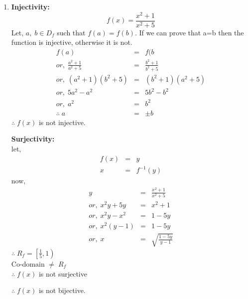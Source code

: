 \documentclass{article}
\begin{document}
\begin{enumerate}
\item{
\begin{minipage}[t]{0.4\linewidth}
\textbf{Injectivity:}
    $$f(x) = \frac{x^2 +1}{x^2+5}$$
Let, $a,\;b\in D_f$ such that $f(a) = f(b)$. If we can prove that a=b then the function is injective, otherwise it is not.
\begin{eqnarray*}
    f(a) &=& f(b\\
    or,\;\frac{a^2+1}{a^2+5} &=& \frac{b^2+1}{b^2+5}\\
    or,\; (a^2+1)(b^2+5) &=& (b^2+1)(a^2+5)\\
    or,\; 5a^2-a^2 &=& 5b^2 - b^2\\
    or,\; a^2 &=& b^2\\
    \therefore \; a &=& \pm b
\end{eqnarray*}
    $\therefore\;f(x)$ is not injective.
\end{minipage}\hfill
\begin{minipage}[t]{0.4\linewidth}
\textbf{Surjectivity:}
\\let,
\begin{eqnarray*}
    f(x) &=& y\\
    x &=& f^{-1}(y)
\end{eqnarray*}
now,
\begin{eqnarray*}
    y &=& \frac{x^2+1}{x^2+5}\\
    or,\;x^2y+5y &=& x^2+1\\
    or,\; x^2y-x^2 &=& 1-5y\\
    or,\;x^2(y-1) &=& 1-5y\\
    or,\; x &=& \sqrt{\frac{1-5y}{y-1}}
\end{eqnarray*}
$\therefore\; R_f = \left[\frac{1}{5}, 1\right)$
\\Co-domain $\ne\;R_f$\\
$\therefore\;f(x)$ is not surjective
\end{minipage}

\vspace{1cm}
\begin{center}
{$\therefore\;f(x)$ is not bijective.}
\end{center}
\vspace{1cm}
}


\end{enumerate}
\end{document}
